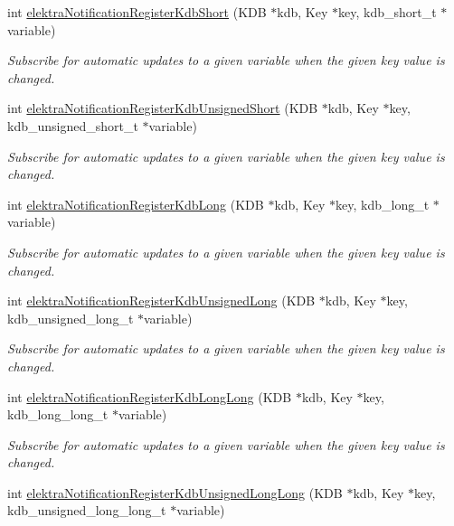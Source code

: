 \begin{DoxyCompactItemize}
int \hyperlink{group__kdbnotification_ga2cb436f9f56b117aed93af70d88cc29c}{elektra\+Notification\+Register\+Kdb\+Short} (K\+DB $\ast$kdb, Key $\ast$key, kdb\+\_\+short\+\_\+t $\ast$variable)
\begin{DoxyCompactList}\small\item\em Subscribe for automatic updates to a given variable when the given key value is changed. \end{DoxyCompactList}\item 
int \hyperlink{group__kdbnotification_ga94b47b5810894136bbdd73279ad45490}{elektra\+Notification\+Register\+Kdb\+Unsigned\+Short} (K\+DB $\ast$kdb, Key $\ast$key, kdb\+\_\+unsigned\+\_\+short\+\_\+t $\ast$variable)
\begin{DoxyCompactList}\small\item\em Subscribe for automatic updates to a given variable when the given key value is changed. \end{DoxyCompactList}\item 
int \hyperlink{group__kdbnotification_ga6c3c7e2dec0a4087ccd434bb478384d7}{elektra\+Notification\+Register\+Kdb\+Long} (K\+DB $\ast$kdb, Key $\ast$key, kdb\+\_\+long\+\_\+t $\ast$variable)
\begin{DoxyCompactList}\small\item\em Subscribe for automatic updates to a given variable when the given key value is changed. \end{DoxyCompactList}\item 
int \hyperlink{group__kdbnotification_ga450849bc96f30c5ececac2d0dda51b4e}{elektra\+Notification\+Register\+Kdb\+Unsigned\+Long} (K\+DB $\ast$kdb, Key $\ast$key, kdb\+\_\+unsigned\+\_\+long\+\_\+t $\ast$variable)
\begin{DoxyCompactList}\small\item\em Subscribe for automatic updates to a given variable when the given key value is changed. \end{DoxyCompactList}\item 
int \hyperlink{group__kdbnotification_ga58fdd6f2ce8237ff21687112076800ca}{elektra\+Notification\+Register\+Kdb\+Long\+Long} (K\+DB $\ast$kdb, Key $\ast$key, kdb\+\_\+long\+\_\+long\+\_\+t $\ast$variable)
\begin{DoxyCompactList}\small\item\em Subscribe for automatic updates to a given variable when the given key value is changed. \end{DoxyCompactList}\item 
int \hyperlink{group__kdbnotification_gad375d4f6b35be2034bb3fa86ca5d8b49}{elektra\+Notification\+Register\+Kdb\+Unsigned\+Long\+Long} (K\+DB $\ast$kdb, Key $\ast$key, kdb\+\_\+unsigned\+\_\+long\+\_\+long\+\_\+t $\ast$variable)

\end{DoxyCompactItemize}
